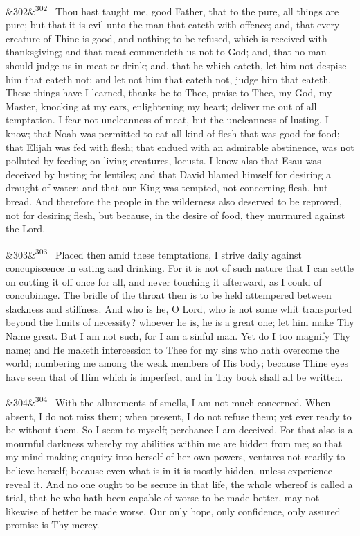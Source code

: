 \documentclass[12pt]{article}
\newcommand{\para}[1][]{\par\noindent\ifx&#1&\else\textsuperscript{\footnotesize #1}~\fi}
\begin{document}
\para[302] Thou hast taught me, good Father, that to the pure, all things are pure; but that it is evil unto the man that eateth with offence; and, that every creature of Thine is good, and nothing to be refused, which is received with thanksgiving; and that meat commendeth us not to God; and, that no man should judge us in meat or drink; and, that he which eateth, let him not despise him that eateth not; and let not him that eateth not, judge him that eateth. These things have I learned, thanks be to Thee, praise to Thee, my God, my Master, knocking at my ears, enlightening my heart; deliver me out of all temptation. I fear not uncleanness of meat, but the uncleanness of lusting. I know; that Noah was permitted to eat all kind of flesh that was good for food; that Elijah was fed with flesh; that endued with an admirable abstinence, was not polluted by feeding on living creatures, locusts. I know also that Esau was deceived by lusting for lentiles; and that David blamed himself for desiring a draught of water; and that our King was tempted, not concerning flesh, but bread. And therefore the people in the wilderness also deserved to be reproved, not for desiring flesh, but because, in the desire of food, they murmured against the Lord.

\para[303] Placed then amid these temptations, I strive daily against concupiscence in eating and drinking. For it is not of such nature that I can settle on cutting it off once for all, and never touching it afterward, as I could of concubinage. The bridle of the throat then is to be held attempered between slackness and stiffness. And who is he, O Lord, who is not some whit transported beyond the limits of necessity? whoever he is, he is a great one; let him make Thy Name great. But I am not such, for I am a sinful man. Yet do I too magnify Thy name; and He maketh intercession to Thee for my sins who hath overcome the world; numbering me among the weak members of His body; because Thine eyes have seen that of Him which is imperfect, and in Thy book shall all be written.

\para[304] With the allurements of smells, I am not much concerned. When absent, I do not miss them; when present, I do not refuse them; yet ever ready to be without them. So I seem to myself; perchance I am deceived. For that also is a mournful darkness whereby my abilities within me are hidden from me; so that my mind making enquiry into herself of her own powers, ventures not readily to believe herself; because even what is in it is mostly hidden, unless experience reveal it. And no one ought to be secure in that life, the whole whereof is called a trial, that he who hath been capable of worse to be made better, may not likewise of better be made worse. Our only hope, only confidence, only assured promise is Thy mercy.
\end{document}
